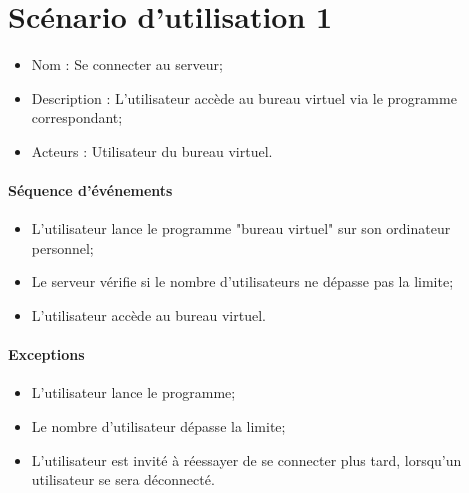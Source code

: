 




\section{Scénario d'utilisation 1}
\begin{itemize}
	\item Nom : Se connecter au serveur;
	\item Description : L'utilisateur accède au bureau virtuel via le programme correspondant;
	\item Acteurs : Utilisateur du bureau virtuel.
\end{itemize}

\paragraph{Séquence d'événements}
\begin{itemize}
	\item L'utilisateur lance le programme "bureau virtuel" sur son ordinateur personnel;
	\item Le serveur vérifie si le nombre d'utilisateurs ne dépasse pas la limite;
	\item L'utilisateur accède au bureau virtuel.
\end{itemize}

\paragraph{Exceptions}
\begin{itemize}
	\item L'utilisateur lance le programme;
	\item Le nombre d'utilisateur dépasse la limite;
	\item L'utilisateur est invité à réessayer de se connecter plus tard, lorsqu'un utilisateur se sera déconnecté.
\end{itemize}

